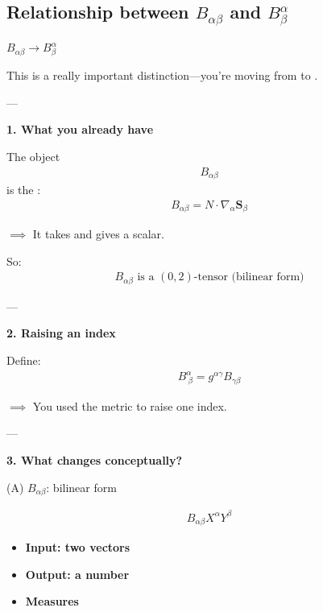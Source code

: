 \documentclass[12pt,a4paper]{report}
\begin{document}
\begin{description}
\begin{description}
\end{description}

\subsection*{Relationship between $B_{\alpha\beta}$ and $B^\alpha_\beta$}
\item \textbf{$B_{\alpha\beta} \to B^\alpha_\beta$}

This is a really important distinction—you're moving from  to .

---

\begin{description}
\item \textbf{1. What you already have}

The object
\begin{align*}
B_{\alpha\beta}
\end{align*}
is the :
\begin{align*}
B_{\alpha\beta} = N \cdot \nabla_\alpha \mathbf{S}_\beta
\end{align*}

$\implies$ It takes  and gives a scalar.

So:
\begin{align*}
\boxed{
B_{\alpha\beta} \text{ is a } (0,2)\text{-tensor (bilinear form)}
}
\end{align*}

---

\item \textbf{2. Raising an index}

Define:
\begin{align*}
B^\alpha_{\ \beta} = g^{\alpha\gamma} B_{\gamma\beta}
\end{align*}

$\implies$ You used the metric to raise one index.

---

\item \textbf{3. What changes conceptually?}

\begin{description}
\item (A) $B_{\alpha\beta}$: bilinear form

\begin{align*}
B_{\alpha\beta} X^\alpha Y^\beta
\end{align*}

\begin{itemize}
\item \textbf{Input: two vectors}
\item \textbf{Output: a number}
\item \textbf{Measures }
\end{itemize}


\end{description}
\end{description}
\end{description}
\end{document}
